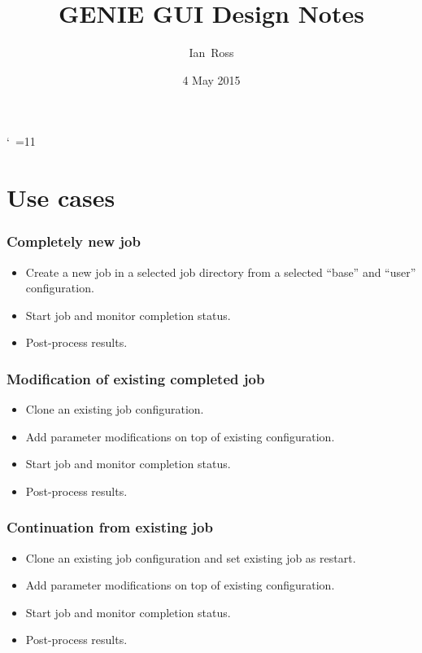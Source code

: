 \documentclass[a4paper,11pt,article]{memoir}
\title{GENIE GUI Design Notes}
\author{Ian~Ross}
\date{4 May 2015}
\begin{document}
\catcode`~=11    %

\tightlists

\maketitle

\chapter{Use cases}

\subsection*{Completely new job}

\begin{itemize}
  \item{Create a new job in a selected job directory from a selected
    ``base'' and ``user'' configuration.}
  \item{Start job and monitor completion status.}
  \item{Post-process results.}
\end{itemize}

\subsection*{Modification of existing completed job}

\begin{itemize}
  \item{Clone an existing job configuration.}
  \item{Add parameter modifications on top of existing configuration.}
  \item{Start job and monitor completion status.}
  \item{Post-process results.}
\end{itemize}

\subsection*{Continuation from existing job}

\begin{itemize}
  \item{Clone an existing job configuration and set existing job as
    restart.}
  \item{Add parameter modifications on top of existing configuration.}
  \item{Start job and monitor completion status.}
  \item{Post-process results.}
\end{itemize}
\end{document}
